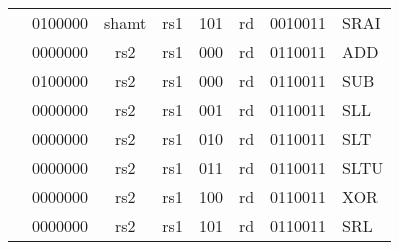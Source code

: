 \begin{table}[p]
\begin{small}
\begin{center}
\begin{tabular}{p{0in}p{0.4in}p{0.05in}p{0.05in}p{0.05in}p{0.05in}p{0.4in}p{0.6in}p{0.4in}p{0.6in}p{0.7in}l}
        &
        \multicolumn{4}{|c|}{0100000} &
        \multicolumn{2}{c|}{shamt} &
        \multicolumn{1}{c|}{rs1} &
        \multicolumn{1}{c|}{101} &
        \multicolumn{1}{c|}{rd} &
        \multicolumn{1}{c|}{0010011} & SRAI \\
        \cline{2-11}

        &
        \multicolumn{4}{|c|}{0000000} &
        \multicolumn{2}{c|}{rs2} &
        \multicolumn{1}{c|}{rs1} &
        \multicolumn{1}{c|}{000} &
        \multicolumn{1}{c|}{rd} &
        \multicolumn{1}{c|}{0110011} & ADD \\
        \cline{2-11}

        &
        \multicolumn{4}{|c|}{0100000} &
        \multicolumn{2}{c|}{rs2} &
        \multicolumn{1}{c|}{rs1} &
        \multicolumn{1}{c|}{000} &
        \multicolumn{1}{c|}{rd} &
        \multicolumn{1}{c|}{0110011} & SUB \\
        \cline{2-11}

        &
        \multicolumn{4}{|c|}{0000000} &
        \multicolumn{2}{c|}{rs2} &
        \multicolumn{1}{c|}{rs1} &
        \multicolumn{1}{c|}{001} &
        \multicolumn{1}{c|}{rd} &
        \multicolumn{1}{c|}{0110011} & SLL \\
        \cline{2-11}

        &
        \multicolumn{4}{|c|}{0000000} &
        \multicolumn{2}{c|}{rs2} &
        \multicolumn{1}{c|}{rs1} &
        \multicolumn{1}{c|}{010} &
        \multicolumn{1}{c|}{rd} &
        \multicolumn{1}{c|}{0110011} & SLT \\
        \cline{2-11}

        &
        \multicolumn{4}{|c|}{0000000} &
        \multicolumn{2}{c|}{rs2} &
        \multicolumn{1}{c|}{rs1} &
        \multicolumn{1}{c|}{011} &
        \multicolumn{1}{c|}{rd} &
        \multicolumn{1}{c|}{0110011} & SLTU \\
        \cline{2-11}

        &
        \multicolumn{4}{|c|}{0000000} &
        \multicolumn{2}{c|}{rs2} &
        \multicolumn{1}{c|}{rs1} &
        \multicolumn{1}{c|}{100} &
        \multicolumn{1}{c|}{rd} &
        \multicolumn{1}{c|}{0110011} & XOR \\
        \cline{2-11}

        &
        \multicolumn{4}{|c|}{0000000} &
        \multicolumn{2}{c|}{rs2} &
        \multicolumn{1}{c|}{rs1} &
        \multicolumn{1}{c|}{101} &
        \multicolumn{1}{c|}{rd} &
        \multicolumn{1}{c|}{0110011} & SRL \\
        \cline{2-11}


\end{tabular}
\end{center}
\end{small}
\end{table}
